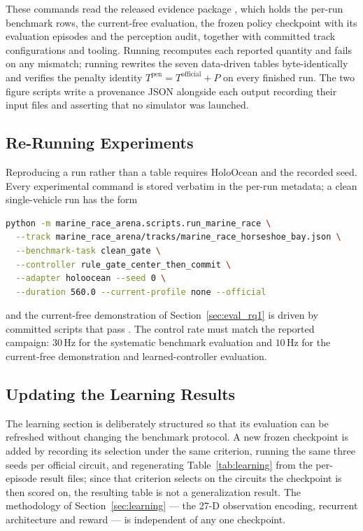 These commands read the released evidence package , which
holds the per-run benchmark rows, the current-free evaluation, the frozen policy
checkpoint with its evaluation episodes and the perception audit, together with
committed track configurations and tooling. Running 
recomputes each reported quantity and fails on any mismatch; running
 rewrites the seven data-driven tables
byte-identically and verifies the penalty identity
$T^{\mathrm{pen}}=T^{\mathrm{official}}+P$ on every finished run. The two figure
scripts write a provenance JSON alongside each output recording their input
files and asserting that no simulator was launched.

\subsection{Re-Running Experiments}

Reproducing a run rather than a table requires HoloOcean and the recorded seed.
Every experimental command is stored verbatim in the per-run metadata; a clean
single-vehicle run has the form

\begin{lstlisting}[language=bash]
python -m marine_race_arena.scripts.run_marine_race \
  --track marine_race_arena/tracks/marine_race_horseshoe_bay.json \
  --benchmark-task clean_gate \
  --controller rule_gate_center_then_commit \
  --adapter holoocean --seed 0 \
  --duration 560.0 --current-profile none --official
\end{lstlisting}

and the current-free demonstration of Section~\ref{sec:eval_rq1} is driven by
committed scripts that pass . The control rate must
match the reported campaign: $30$\,Hz for the systematic benchmark evaluation
and $10$\,Hz for the current-free demonstration and learned-controller
evaluation.

\subsection{Updating the Learning Results}

The learning section is deliberately structured so that its evaluation can be
refreshed without changing the benchmark protocol. A new frozen checkpoint is
added by recording its selection under the same criterion, running the same three
seeds per official circuit, and regenerating Table~\ref{tab:learning} from the
per-episode result files; since that criterion selects on the circuits the
checkpoint is then scored on, the resulting table is not a generalization result.
The methodology of Section~\ref{sec:learning} --- the 27-D observation encoding,
recurrent architecture and reward --- is independent of any one checkpoint.

